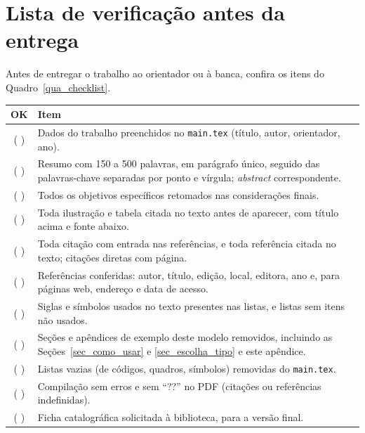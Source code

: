 \section{Lista de verificação antes da entrega}

Antes de entregar o trabalho ao orientador ou à banca, confira os itens do Quadro~\ref{qua_checklist}.

\begin{quadro}[htb]
	\centering
	\caption{Lista de verificação antes da entrega.}
	\label{qua_checklist}
	\small
	\begin{tabularx}{\textwidth}{|c|X|}
		\hline
		\textbf{OK} & \textbf{Item} \\ \hline
		( \quad ) & Dados do trabalho preenchidos no \texttt{main.tex} (título, autor, orientador, ano). \\ \hline
		( \quad ) & Resumo com 150 a 500 palavras, em parágrafo único, seguido das palavras-chave separadas por ponto e vírgula; \textit{abstract} correspondente. \\ \hline
		( \quad ) & Todos os objetivos específicos retomados nas considerações finais. \\ \hline
		( \quad ) & Toda ilustração e tabela citada no texto antes de aparecer, com título acima e fonte abaixo. \\ \hline
		( \quad ) & Toda citação com entrada nas referências, e toda referência citada no texto; citações diretas com página. \\ \hline
		( \quad ) & Referências conferidas: autor, título, edição, local, editora, ano e, para páginas web, endereço e data de acesso. \\ \hline
		( \quad ) & Siglas e símbolos usados no texto presentes nas listas, e listas sem itens não usados. \\ \hline
		( \quad ) & Seções e apêndices de exemplo deste modelo removidos, incluindo as Seções~\ref{sec_como_usar} e \ref{sec_escolha_tipo} e este apêndice. \\ \hline
		( \quad ) & Listas vazias (de códigos, quadros, símbolos) removidas do \texttt{main.tex}. \\ \hline
		( \quad ) & Compilação sem erros e sem \enquote{??} no PDF (citações ou referências indefinidas). \\ \hline
		( \quad ) & Ficha catalográfica solicitada à biblioteca, para a versão final. \\ \hline
	\end{tabularx}
\end{quadro}
